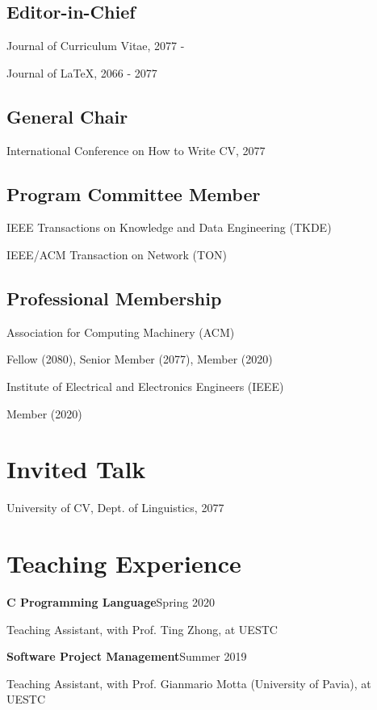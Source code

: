 \documentclass{article}
\newcommand{\cvsection}[1]{\section*{\rmfamily#1}}
\newcommand{\cvsubsection}[1]{\subsection*{\rmfamily\hspace{1.6em}#1}}
\begin{document}
\cvsubsection{Editor-in-Chief}
\indent

Journal of Curriculum Vitae, 2077 -

Journal of \LaTeX, 2066 - 2077

\cvsubsection{General Chair}
\indent

International Conference on How to Write CV, 2077

\cvsubsection{Program Committee Member}
\indent

IEEE Transactions on Knowledge and Data Engineering (TKDE)

IEEE/ACM Transaction on Network (TON)

\cvsubsection{Professional Membership}
\indent

Association for Computing Machinery (ACM)

\hspace{2em}Fellow (2080), Senior Member (2077), Member (2020)

Institute of Electrical and Electronics Engineers (IEEE)

\hspace{2em}Member (2020)









\cvsection{Invited Talk}
\indent 

University of CV, Dept. of Linguistics, 2077 



\cvsection{Teaching Experience}
\indent

\textbf{C Programming Language}\hfill Spring 2020

\hspace{2em}Teaching Assistant, with Prof. Ting Zhong, at UESTC

\textbf{Software Project Management}\hfill Summer 2019

\hspace{2em}Teaching Assistant, with Prof. Gianmario Motta (University of Pavia), at UESTC






\end{document}
